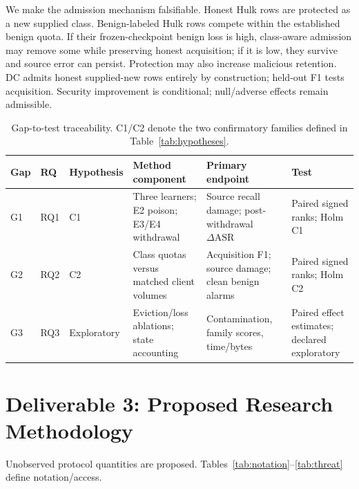 \documentclass[10pt,a4paper]{article}
\begin{document}
We make the admission mechanism falsifiable. Honest Hulk rows are protected as a new supplied class. Benign-labeled Hulk rows compete within the established benign quota. If their frozen-checkpoint benign loss is high, class-aware admission may remove some while preserving honest acquisition; if it is low, they survive and source error can persist. Protection may also increase malicious retention. DC admits honest supplied-new rows entirely by construction; held-out F1 tests acquisition. Security improvement is conditional; null/adverse effects remain admissible.

\begin{table}[htbp]
\centering\footnotesize
\caption{Gap-to-test traceability. C1/C2 denote the two confirmatory families defined in Table~\ref{tab:hypotheses}.}
\label{tab:trace}
\begin{tabularx}{\linewidth}{L{0.7cm}L{0.8cm}L{1.2cm}Y Y Y}
\toprule
Gap & RQ & Hypothesis & Method component & Primary endpoint & Test\\
\midrule
G1 & RQ1 & C1 & Three learners; E2 poison; E3/E4 withdrawal & Source recall damage; post-withdrawal $\Delta\mathrm{ASR}$ & Paired signed ranks; Holm C1\\
G2 & RQ2 & C2 & Class quotas versus matched client volumes & Acquisition F1; source damage; clean benign alarms & Paired signed ranks; Holm C2\\
G3 & RQ3 & Exploratory & Eviction/loss ablations; state accounting & Contamination, family scores, time/bytes & Paired effect estimates; declared exploratory\\
\bottomrule
\end{tabularx}
\end{table}

\section{Deliverable 3: Proposed Research Methodology}
Unobserved protocol quantities are proposed. Tables~\ref{tab:notation}--\ref{tab:threat} define notation/access.
\end{document}
